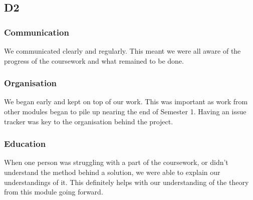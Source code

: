 \subsection{D2}
    \subsubsection{Communication} We communicated clearly and regularly. This meant we were all aware of the progress of the coursework and what remained to be done. 
    \subsubsection{Organisation} We began early and kept on top of our work. This was important as work from other modules began to pile up nearing the end of Semester 1. Having an issue tracker was key to the organisation behind the project.
    \subsubsection{Education} When one person was struggling with a part of the coursework, or didn't understand the method behind a solution, we were able to explain our understandings of it. This definitely helps with our understanding of the theory from this module going forward.
